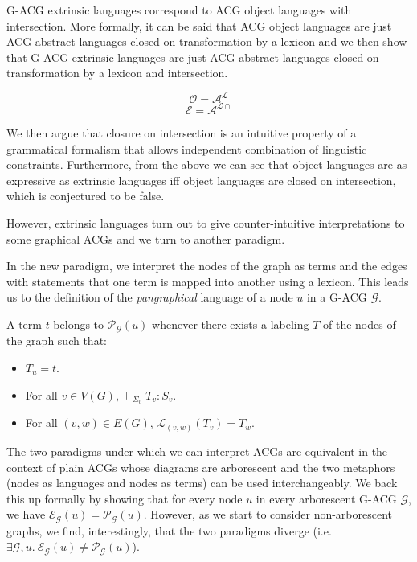 \documentclass[twocolumn]{article}
\begin{document}
G-ACG extrinsic languages correspond to ACG object languages with
intersection. More formally, it can be said that ACG object languages
are just ACG abstract languages closed on transformation by a lexicon
and we then show that G-ACG extrinsic languages are just ACG abstract
languages closed on transformation by a lexicon and intersection.

$$
\mathcal{O} = \mathcal{A}^{\mathcal{L}}
$$
$$
\mathcal{E} = \mathcal{A}^{\mathcal{L}{\cap}}
$$

We then argue that closure on intersection is an intuitive property of a
grammatical formalism that allows independent combination of linguistic
constraints. Furthermore, from the above we can see that object
languages are as expressive as extrinsic languages iff object languages
are closed on intersection, which is conjectured to be false.

However, extrinsic languages turn out to give counter-intuitive
interpretations to some graphical ACGs and we turn to another paradigm.

In the new paradigm, we interpret the nodes of the graph as terms and
the edges with statements that one term is mapped into another using a
lexicon. This leads us to the definition of the \emph{pangraphical}
language of a node $u$ in a G-ACG $\mathcal{G}$.

A term $t$ belongs to $\mathcal{P}_{\mathcal{G}}(u)$ whenever there
exists a labeling $T$ of the nodes of the graph such that:

\begin{itemize}
  \item $T_u = t$.
  \item For all $v \in V(G)$, $\vdash_{\Sigma_v} T_v : S_v$.
  \item For all $(v,w) \in E(G)$, $\mathcal{L}_{(v,w)}(T_v) = T_w$.
\end{itemize}

The two paradigms under which we can interpret ACGs are equivalent in
the context of plain ACGs whose diagrams are arborescent and the two
metaphors (nodes as languages and nodes as terms) can be used
interchangeably. We back this up formally by showing that for every node
$u$ in every arborescent G-ACG $\mathcal{G}$, we have
$\mathcal{E}_{\mathcal{G}}(u) = \mathcal{P}_{\mathcal{G}}(u)$. However,
as we start to consider non-arborescent graphs, we find, interestingly,
that the two paradigms diverge (i.e. $\exists \mathcal{G},
u.\ \mathcal{E}_{\mathcal{G}}(u) \neq \mathcal{P}_{\mathcal{G}}(u)$).
\end{document}

